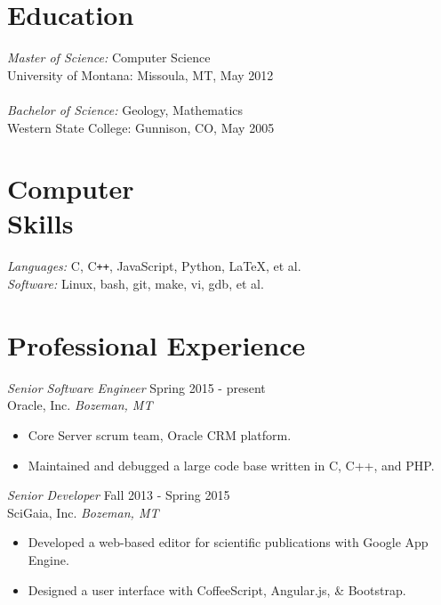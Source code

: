 \documentclass[line,margin]{res}
\begin{document}
\address{\texttt{perry@rphv.net} | 317.695.9860  }
\address{323 S. Bozeman Ave, Bozeman, MT 59715}
 
\begin{resume}
 
\section{\sc Education} 
        {\sl Master of Science:} Computer Science\\
        University of Montana: Missoula, MT, May 2012\\
        \\
        {\sl Bachelor of Science:} Geology, Mathematics \\
        Western State College: Gunnison, CO, May 2005 \\
 
\section{\sc Computer \\ Skills}    
        {\sl Languages:} C, C\verb!++!, JavaScript, Python, \LaTeX, et al.\\
        {\sl Software:} Linux, bash, git, make, vi, gdb, et al.\\

\section{\sc Professional Experience} 

        {\sl Senior Software Engineer} \hfill  Spring 2015 - present\\
        Oracle, Inc. \hfill {\sl Bozeman, MT}
        \begin{itemize} \itemsep -2pt
            \item Core Server scrum team, Oracle CRM platform.
	   \item Maintained and debugged a large code base written in C, C++, and PHP.
        \end{itemize}

        {\sl Senior Developer} \hfill  Fall 2013 - Spring 2015\\
        SciGaia, Inc. \hfill {\sl Bozeman, MT}
        \begin{itemize} \itemsep -2pt
            \item Developed a web-based editor for scientific publications with Google App Engine.
            \item Designed a user interface with CoffeeScript, Angular.js, \& Bootstrap.
        \end{itemize}


\end{resume}
\end{document}
